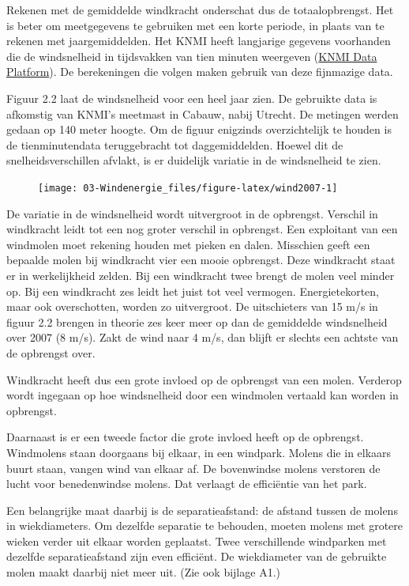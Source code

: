 \documentclass[
  11pt,
  a4paper,
]{book}
\begin{document}
Rekenen met de gemiddelde windkracht onderschat dus de totaalopbrengst. Het is beter om meetgegevens te gebruiken met een korte periode, in plaats van te rekenen met jaargemiddelden. Het KNMI heeft langjarige gegevens voorhanden die de windsnelheid in tijdsvakken van tien minuten weergeven (\href{https://dataplatform.knmi.nl}{KNMI Data Platform}). De berekeningen die volgen maken gebruik van deze fijnmazige data.

Figuur 2.2 laat de windsnelheid voor een heel jaar zien. De gebruikte data is afkomstig van KNMI's meetmast in Cabauw, nabij Utrecht. De metingen werden gedaan op 140 meter hoogte. Om de figuur enigzinds overzichtelijk te houden is de tienminutendata teruggebracht tot daggemiddelden. Hoewel dit de snelheidsverschillen afvlakt, is er duidelijk variatie in de windsnelheid te zien.

\begin{figure}[b]

{\centering \texttt{[image: 03-Windenergie\_files/figure-latex/wind2007-1]} 

}

\end{figure}

De variatie in de windsnelheid wordt uitvergroot in de opbrengst. Verschil in windkracht leidt tot een nog groter verschil in opbrengst. Een exploitant van een windmolen moet rekening houden met pieken en dalen. Misschien geeft een bepaalde molen bij windkracht vier een mooie opbrengst. Deze windkracht staat er in werkelijkheid zelden. Bij een windkracht twee brengt de molen veel minder op. Bij een windkracht zes leidt het juist tot veel vermogen. Energietekorten, maar ook overschotten, worden zo uitvergroot. De uitschieters van 15 m/s in figuur 2.2 brengen in theorie zes keer meer op dan de gemiddelde windsnelheid over 2007 (8 m/s). Zakt de wind naar 4 m/s, dan blijft er slechts een achtste van de opbrengst over.

Windkracht heeft dus een grote invloed op de opbrengst van een molen. Verderop wordt ingegaan op hoe windsnelheid door een windmolen vertaald kan worden in opbrengst.

Daarnaast is er een tweede factor die grote invloed heeft op de opbrengst. Windmolens staan doorgaans bij elkaar, in een windpark. Molens die in elkaars buurt staan, vangen wind van elkaar af. De bovenwindse molens verstoren de lucht voor benedenwindse molens. Dat verlaagt de efficiëntie van het park.

Een belangrijke maat daarbij is de separatieafstand: de afstand tussen de molens in wiekdiameters. Om dezelfde separatie te behouden, moeten molens met grotere wieken verder uit elkaar worden geplaatst. Twee verschillende windparken met dezelfde separatieafstand zijn even efficiënt. De wiekdiameter van de gebruikte molen maakt daarbij niet meer uit. (Zie ook bijlage A1.)
\end{document}
